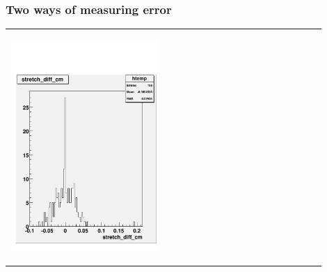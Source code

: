 \documentclass[compress]{beamer}
\begin{document}
\begin{frame}
\frametitle{Two ways of measuring error}

\begin{center}
\begin{tabular}{p{0.45\linewidth} p{0.45\linewidth}}
\begin{minipage}{\linewidth}
\begin{center}
\includegraphics[width=0.9\linewidth]{stretch_factor.pdf}
\end{center}
\end{minipage} &
\begin{minipage}{\linewidth}
\begin{center}

\end{center}
\end{minipage}
\end{tabular}
\end{center}
\end{frame}
\end{document}
